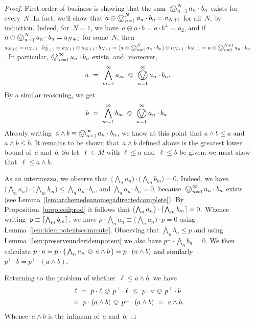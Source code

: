 \documentclass[10pt,conference]{IEEEtran}
\DeclarePairedDelimiter{\ceil}{\lceil}{\rceil}
\theoremstyle{definition}
\newcommand{\bigovee}{\mathop{\vphantom{\sum}\mathchoice%
        {\vcenter{\hbox{\huge $\ovee$}}}%
        {\vcenter{\hbox{\Large $\ovee$}}}%
        {\ovee}{\ovee}}\displaylimits}
\begin{document}
\begin{proof}
First order of business is showing 
    that the sum~$\bigovee_{n=1}^N a_n \cdot b_n$ exists for every~$N$.
    In fact,
    we'll show that $a\ominus \bigovee_{n=1}^N a_n\cdot b_n = a_{N+1}$
    for all~$N$,
    by induction.
Indeed, for~$N=1$,
we have~$a\ominus a\cdot b=a\cdot b^\perp = a_2$,
and if
$a\ominus \bigovee_{n=1}^N a_n\cdot b_n = a_{N+1}$
for some~$N$,
then~$a_{N+2} = a_{N+1} \cdot b_{N+1}^\perp
    = a_{N+1} \ominus a_{N+1}\cdot  b_{N+1}
    = (a\ominus \bigovee_{n=1}^N a_n\cdot b_n)\ominus a_{N+1}\cdot b_{N+1}
    = a\ominus \bigovee_{n=1}^{N+1} a_n \cdot b_n$.
    In particular,
    $\bigovee_{n=1}^\infty a_n \cdot b_n$ exists,
    and, moreover,
    $$
    a\ =\ \bigwedge_{m=1}^\infty a_m \ \ovee\ 
    \bigovee_{n=1}^\infty a_n \cdot b_n.
    $$
By a similar reasoning, we get
    $$
    b\ =\ \bigwedge_{m=1}^\infty b_m \ \ovee\ 
    \bigovee_{n=1}^\infty a_n \cdot b_n.
    $$
Already writing~$a\wedge b \equiv
    \bigovee_{n=1}^\infty a_n \cdot b_n$,
    we know at this point that
    $a\wedge b \leq a$ and~$a\wedge b\leq b$.
    It remains to be shown that~$a\wedge b$
    defined above is the greatest lower bound of~$a$ and~$b$.
    So let~$\ell\in M$ with $\ell\leq a$ and~$\ell \leq b$ 
    be given; we must show that~$\ell\leq a\wedge b$.


    As an intermezzo, we observe that~$\bigl(\bigwedge_n a_n\bigr)\cdot
    \bigl(\bigwedge_m b_m\bigr)=0$.
    Indeed, we have
    $\bigl(\bigwedge_n a_n\bigr)\cdot
    \bigl(\bigwedge_m b_m\bigr)
    \leq \bigwedge_n a_n\cdot b_n$,
    and
    $\bigwedge_n a_n \cdot b_n = 0$,
    because~$\bigovee_{n=1}^\infty a_n\cdot b_n$ exists (see Lemma~\ref{lem:archemedeanomegadirectedcomplete}).
    By Proposition~\ref{prop:ceilprod}
    it follows that $\bigl(\bigwedge_n a_n\bigr)\cdot
    \ceil{\bigwedge_m b_m} = 0$.
    Whence writing~$p \equiv \ceil{\bigwedge_m b_m}$,
    we have $p\cdot \bigwedge_n a_n \equiv \bigl(\bigwedge_n a_n\bigr)\cdot p
    = 0$ 
    using Lemma~\ref{lem:idempotentscommute}.
    Observing that $\bigwedge_n b_n\leq p$ and using Lemma~\ref{lem:preserveunderidempotent} we also have $p^\perp \cdot \bigwedge_n b_n = 0$.
    We then calculate  $p\cdot a
    =p\cdot \bigl(\,\bigwedge_n a_n \,\ovee\, a\wedge b\,\bigr) 
    = p\cdot (a\wedge b)$ and similarly
    $p^\perp \cdot b= p^\perp \cdot (a\wedge b)$.

    Returning to the problem of whether~$\ell\leq a\wedge b$,
    we have
   \begin{multline*}
\ell \ =\  
p\cdot \ell\,\ovee\, p^\perp\cdot  \ell
\ \leq\  p\cdot a\,\ovee\, p^\perp\cdot  b \\
    \ =\ p\cdot (a\wedge b) \,\ovee\, p^\perp\cdot (a\wedge b)
     \ = \ a\wedge b.
   \end{multline*}
    Whence~$a\wedge b$ is the infimum of~$a$ and~$b$.
\end{proof}
\end{document}
